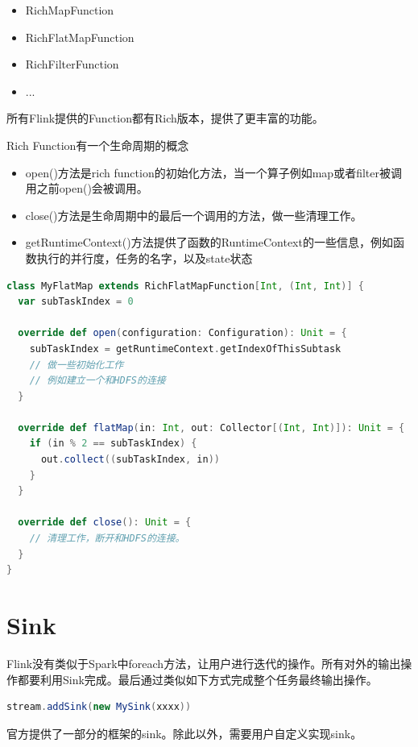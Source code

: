 \documentclass[oneside]{ctexbook}
\begin{document}
\begin{itemize}
\item RichMapFunction
\item RichFlatMapFunction
\item RichFilterFunction
\item ...
\end{itemize}

所有Flink提供的Function都有Rich版本，提供了更丰富的功能。

Rich Function有一个生命周期的概念

\begin{itemize}
\item open()方法是rich function的初始化方法，当一个算子例如map或者filter被调用之前open()会被调用。
\item close()方法是生命周期中的最后一个调用的方法，做一些清理工作。
\item getRuntimeContext()方法提供了函数的RuntimeContext的一些信息，例如函数执行的并行度，任务的名字，以及state状态
\end{itemize}

\begin{lstlisting}[language=scala, breaklines]
class MyFlatMap extends RichFlatMapFunction[Int, (Int, Int)] {
  var subTaskIndex = 0

  override def open(configuration: Configuration): Unit = {
    subTaskIndex = getRuntimeContext.getIndexOfThisSubtask
    // 做一些初始化工作
    // 例如建立一个和HDFS的连接
  }

  override def flatMap(in: Int, out: Collector[(Int, Int)]): Unit = {
    if (in % 2 == subTaskIndex) {
      out.collect((subTaskIndex, in))
    }
  }

  override def close(): Unit = {
    // 清理工作，断开和HDFS的连接。
  }
}
\end{lstlisting}

\section{Sink}

Flink没有类似于Spark中foreach方法，让用户进行迭代的操作。所有对外的输出操作都要利用Sink完成。最后通过类似如下方式完成整个任务最终输出操作。

\begin{lstlisting}[language=scala]
stream.addSink(new MySink(xxxx)) 
\end{lstlisting}

官方提供了一部分的框架的sink。除此以外，需要用户自定义实现sink。   
\end{document}
